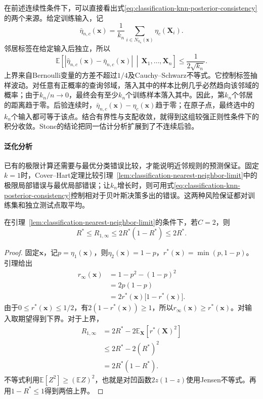 在前述连续性条件下，可以直接看出式\eqref{eq:classification-knn-posterior-consistency}的两个来源。给定训练输入，记
\[
  \bar\eta_{n,c}(\bm{x})
  =\frac{1}{k_n}\sum_{i\in N_{k_n}(\bm{x})}\eta_c(\bm{X}_i).
\]
邻居标签在给定输入后独立，所以
\[
  \mathbb{E}\!\left[
    |\hat\eta_{n,c}(\bm{x})-\bar\eta_{n,c}(\bm{x})|
    \,\middle|\,\bm{X}_1,\ldots,\bm{X}_n
  \right]\leq\frac{1}{2\sqrt{k_n}}.
\]
上界来自Bernoulli变量的方差不超过$1/4$及Cauchy--Schwarz不等式。它控制标签抽样波动。对任意有正概率的查询邻域，落入其中的样本比例几乎必然趋向该邻域的概率；由于$k_n/n\to0$，最终会有至少$k_n$个训练样本落入其中。因此，第$k_n$个邻居的距离趋于零。后验连续时，$\bar\eta_{n,c}(\bm{x})-\eta_c(\bm{x})$趋于零；在原子点，最终选中的$k_n$个输入都可等于该点。结合有界性与支配收敛，就得到这组较强正则性条件下的积分收敛。Stone的结论把同一估计分析扩展到了不连续后验。

\paragraph{泛化分析}

已有的极限计算还需要与最优分类错误比较，才能说明近邻规则的预测保证。固定$k=1$时，Cover--Hart定理比较引理~\ref{lem:classification-nearest-neighbor-limit}中的极限局部错误与最优局部错误；让$k_n$增长时，则可用式\eqref{eq:classification-knn-posterior-consistency}控制相对于贝叶斯决策多出的错误。这两种风险保证都对训练集和独立测试点取平均。

\begin{theorem}
  \label{thm:classification-cover-hart-binary}
  在引理~\ref{lem:classification-nearest-neighbor-limit}的条件下，若$C=2$，则
  \begin{equation}
    R^\ast\leq R_{1,\infty}
    \leq2R^\ast(1-R^\ast)\leq2R^\ast.
    \label{eq:classification-cover-hart-binary}
  \end{equation}
\end{theorem}

\begin{proof}
  固定$\bm{x}$，记$p=\eta_1(\bm{x})$，则$\eta_2(\bm{x})=1-p$，$r^\ast(\bm{x})=\min(p,1-p)$。引理给出
  \begin{align*}
    r_\infty(\bm{x})
    &=1-p^2-(1-p)^2\\
    &=2p(1-p)\\
    &=2r^\ast(\bm{x})\bigl[1-r^\ast(\bm{x})\bigr].
  \end{align*}
  由于$0\leq r^\ast(\bm{x})\leq1/2$，有$2(1-r^\ast(\bm{x}))\geq1$，所以$r_\infty(\bm{x})\geq r^\ast(\bm{x})$。对输入取期望得到下界。对于上界，
  \begin{align*}
    R_{1,\infty}
    &=2R^\ast-2\mathbb{E}_{\bm{X}}[r^\ast(\bm{X})^2]\\
    &\leq2R^\ast-2(R^\ast)^2\\
    &=2R^\ast(1-R^\ast).
  \end{align*}
  不等式利用$\mathbb{E}[Z^2]\geq(\mathbb{E}Z)^2$，也就是对凹函数$2z(1-z)$使用Jensen不等式。再用$1-R^\ast\leq1$得到两倍上界。
\end{proof}

